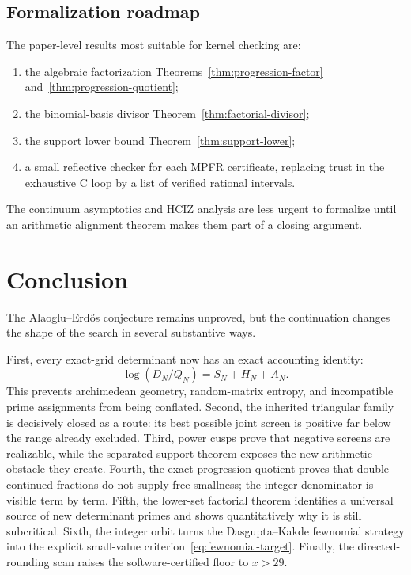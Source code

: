 \documentclass[11pt]{article}
\newcommand{\1}{\mathbf 1}
\theoremstyle{plain}
\theoremstyle{definition}
\theoremstyle{remark}
\begin{document}
\subsection{Formalization roadmap}

The paper-level results most suitable for kernel checking are:
\begin{enumerate}[leftmargin=2.2em]
\item the algebraic factorization
Theorems~\ref{thm:progression-factor} and~\ref{thm:progression-quotient};
\item the binomial-basis divisor Theorem~\ref{thm:factorial-divisor};
\item the support lower bound Theorem~\ref{thm:support-lower};
\item a small reflective checker for each MPFR certificate, replacing trust
      in the exhaustive C loop by a list of verified rational intervals.
\end{enumerate}
The continuum asymptotics and HCIZ analysis are less urgent to formalize
until an arithmetic alignment theorem makes them part of a closing argument.

\section{Conclusion}
\label{sec:conclusion}

The Alaoglu--Erd\H{o}s conjecture remains unproved, but the continuation
changes the shape of the search in several substantive ways.

First, every exact-grid determinant now has an exact accounting identity:
\[
 \log(D_N/Q_N)=S_N+H_N+A_N.
\]
This prevents archimedean geometry, random-matrix entropy, and incompatible
prime assignments from being conflated.  Second, the inherited triangular
family is decisively closed as a route: its best possible joint screen is
positive far below the range already excluded.  Third, power cusps prove that
negative screens are realizable, while the separated-support theorem exposes
the new arithmetic obstacle they create.  Fourth, the exact progression
quotient proves that double continued fractions do not supply free smallness;
the integer denominator is visible term by term.  Fifth, the lower-set
factorial theorem identifies a universal source of new determinant primes and
shows quantitatively why it is still subcritical.  Sixth, the integer orbit
turns the Dasgupta--Kakde fewnomial strategy into the explicit small-value
criterion~\eqref{eq:fewnomial-target}.  Finally, the directed-rounding scan
raises the software-certified floor to $x>29$.
\end{document}
